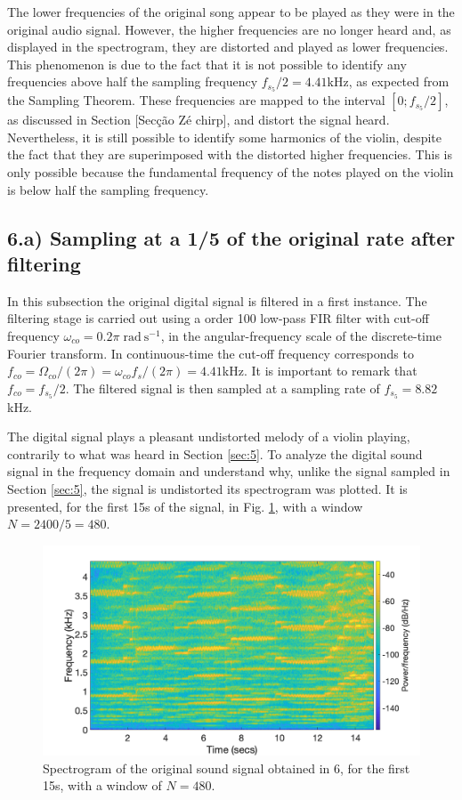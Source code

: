 \documentclass[]{scrartcl}
\begin{document}
The lower frequencies of the original song appear to be played as they were in the original audio signal. However, the higher frequencies are no longer heard and, as displayed in the spectrogram, they are distorted and played as lower frequencies. This phenomenon is due to the fact that it is not possible to identify any frequencies above half the sampling frequency $f_{s_5}/2 = 4.41$kHz, as expected from the Sampling Theorem. These frequencies are mapped to the interval $[0; f_{s_5}/2]$, as discussed in Section [Secção Zé chirp], and distort the signal heard. Nevertheless, it is still possible to identify some harmonics of the violin, despite the fact that they are superimposed with the distorted higher frequencies. This is only possible because the fundamental frequency of the notes played on the violin is below half the sampling frequency.

\subsection{6.a) Sampling at a 1/5 of the original rate after filtering}

In this subsection the original digital signal is filtered in a first instance. The filtering stage is carried out using a order 100 low-pass FIR filter with cut-off frequency $\omega_{co} = 0.2 \pi \; \mathrm{rad\:s^{-1}}$, in the angular-frequency scale of the discrete-time Fourier transform. In continuous-time the cut-off frequency corresponds to $f_{co} = \Omega_{co}/(2\pi) =  \omega_{co} f_s /(2\pi) = 4.41$kHz. It is important to remark that $f_{co} = f_{s_5}/2$. The filtered signal is then sampled at a sampling rate of $f_{s_5}= 8.82$kHz.

The digital signal plays a pleasant undistorted melody of a violin playing, contrarily to what was heard in Section \ref{sec:5}. To analyze the digital sound signal in the frequency domain and understand why, unlike the signal sampled in Section \ref{sec:5}, the signal is undistorted its spectrogram was plotted. It is presented, for the first 15s of the signal, in Fig. \ref{fig:spect_6}, with a window $N = 2400/5=480$.

\begin{figure}[htbp]
	\centering
	\includegraphics[width=1\textwidth]{figures/spect_6.png}
	\caption{Spectrogram of the original sound signal obtained in 6, for the first 15s, with a window of $N = 480$.}
	\label{fig:spect_6}
\end{figure}
\end{document}

